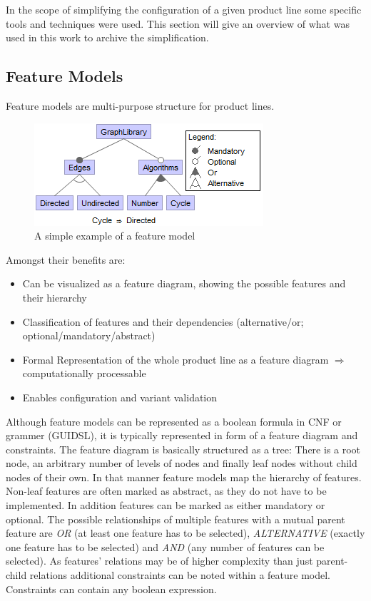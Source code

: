 In the scope of simplifying the configuration of a given product line some specific tools and techniques were used. This section will give an overview of what was used in this work to archive the simplification.

\subsection{Feature Models}
Feature models are multi-purpose structure for product lines. 
\begin{figure}
	\includegraphics{img/img-fm.png}
	\caption{A simple example of a feature model}
	\label{img-fm}
\end{figure}
Amongst their benefits are:
\begin{itemize}
\item Can be visualized as a feature diagram, showing the possible features and their hierarchy
\item Classification of features and their dependencies (alternative/or; optional/mandatory/abstract)
\item Formal Representation of the whole product line as a feature diagram $\Rightarrow$ computationally processable
\item Enables configuration and variant validation
\end{itemize}
Although feature models can be represented as a boolean formula in CNF or grammer (GUIDSL), it is typically represented in form of a feature diagram and constraints. The feature diagram is basically structured as a tree: There is a root node, an arbitrary number of levels of nodes and finally leaf nodes without child nodes of their own. In that manner feature models map the hierarchy of features. Non-leaf features are often marked as abstract, as they do not have to be implemented. In addition features can be marked as either mandatory or optional. The possible relationships of multiple features with a mutual parent feature are \textit{OR} (at least one feature has to be selected), \textit{ALTERNATIVE} (exactly one feature has to be selected) and \textit{AND} (any number of features can be selected). As features' relations may be of higher complexity than just parent-child relations additional constraints can be noted within a feature model. Constraints can contain any boolean expression.

